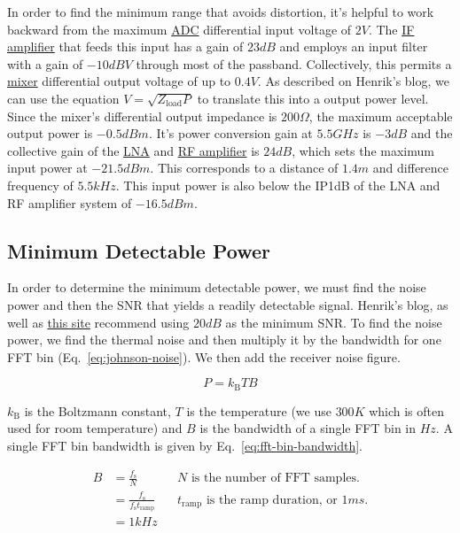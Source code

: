 \documentclass{default}
\begin{document}
In order to find the minimum range that avoids distortion, it's helpful to work backward from the
maximum \hyperref[sec:ltc2292]{ADC} differential input voltage of $2 \si{V}$. The
\hyperref[sec:ada4940-2]{IF amplifier} that feeds this input has a gain of $23 \si{dB}$ and employs
an input filter with a gain of $-10 \si{dBV}$ through most of the passband. Collectively, this
permits a \hyperref[sec:adl5802]{mixer} differential output voltage of up to $0.4 \si{V}$. As
described on Henrik's blog, we can use the equation $V = \sqrt{Z_{\text{load}} P}$ to translate this
into a output power level. Since the mixer's differential output impedance is $200 \si{\Omega}$, the
maximum acceptable output power is $-0.5 \si{dBm}$. It's power conversion gain at $5.5 \si{GHz}$ is
$-3 \si{dB}$ and the collective gain of the \hyperref[sec:sky65404]{LNA} and
\hyperref[sec:trf37a73]{RF amplifier} is $24 \si{dB}$, which sets the maximum input power at
$-21.5 \si{dBm}$. This corresponds to a distance of $1.4 \si{m}$ and difference frequency of
$5.5 \si{kHz}$. This input power is also below the IP1dB of the LNA and RF amplifier system of
$-16.5 \si{dBm}$.

\subsection{Minimum Detectable Power}
\label{sec:min-detectable-power}

In order to determine the minimum detectable power, we must find the noise power and then the SNR
that yields a readily detectable signal. Henrik's blog, as well as
\href{http://www.wireless-nets.com/resources/tutorials/define_SNR_values.html}{this site} recommend
using $20 \si{dB}$ as the minimum SNR\@. To find the noise power, we find the thermal noise and then
multiply it by the bandwidth for one FFT bin (Eq.~\ref{eq:johnson-noise}). We then add the receiver
noise figure.

\begin{equation}
        \label{eq:johnson-noise}
        P = k_{\text{B}} T B
\end{equation}

$k_{\text{B}}$ is the Boltzmann constant, $T$ is the temperature (we use $300 \si{K}$ which is often
used for room temperature) and $B$ is the bandwidth of a single FFT bin in $\si{Hz}$. A single FFT
bin bandwidth is given by Eq.~\ref{eq:fft-bin-bandwidth}.

\begin{align}
        \label{eq:fft-bin-bandwidth}
        B &= \frac{f_{\text{s}}}{N} && \text{$N$ is the number of FFT samples.} \\
        &= \frac{f_{\text{s}}}{f_{\text{s}} t_{\text{ramp}}} && \text{$t_{\text{ramp}}$ is the ramp
                                                                duration, or $1 \si{ms}$.} \\
        &= 1 \si{kHz}
\end{align}
\end{document}
